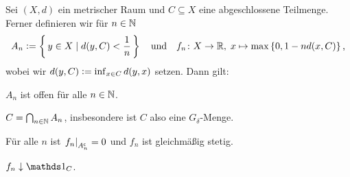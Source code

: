 \documentclass[../main/main.tex]{subfiles}
\begin{document}
	\begin{Hilfssatz}
		Sei $(X, d)$ ein metrischer Raum und $C \subseteq X$ eine abgeschlossene 
		Teilmenge. Ferner definieren wir für $n \in \mathbb{N}$
		$$ A_n \vcentcolon = \left\{\, y \in X \; | \; d(y, C) < \frac{1}{n} \,\right\} \quad \text{und} \quad f_n \colon X \to \mathbb{R}, \; x \mapsto \max \left\{0, 1-n d(x, C)\right\}  \text{,}$$
		wobei wir $d(y, C) \vcentcolon = \inf_{x \in C} d(y, x)$ setzen.
		Dann gilt:
		\begin{enumeratethm}
			\item $A_n$ ist offen für alle $n \in \mathbb{N}$.
			\item $C = \bigcap_{n \in \mathbb{N}} A_n$, insbesondere ist $C$ also eine $G_\delta$-Menge.
			\item Für alle $n$ ist $\left.f_n\right|_{A_n^\mathsf{c}} = 0$ und $f_n$ ist gleichmäßig stetig.
			\item $f_n \convdown \indfct_C$.
		\end{enumeratethm}
	\end{Hilfssatz}
\end{document}

